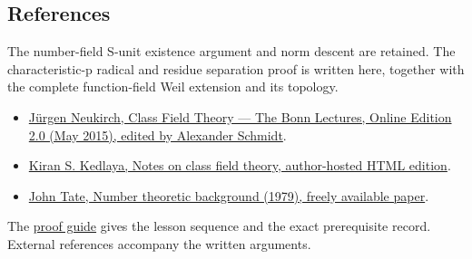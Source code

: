 \documentclass[11pt,a4paper]{article}
\newcommand{\tightlist}{\setlength{\itemsep}{0pt}\setlength{\parskip}{0pt}}
\begin{document}
\subsection{References}\label{references}

The number-field S-unit existence argument and norm descent are
retained. The characteristic-p radical and residue separation proof is
written here, together with the complete function-field Weil extension
and its topology.

\begin{itemize}
\tightlist
\item
  \href{https://www.mathi.uni-heidelberg.de/~schmidt/Neukirch-en/Neukirch_cft_02_may15.pdf}{Jürgen
  Neukirch, Class Field Theory --- The Bonn Lectures, Online Edition 2.0
  (May 2015), edited by Alexander Schmidt}.
\item
  \href{https://kskedlaya.org/cft/sec_abstractcft1.html}{Kiran S.
  Kedlaya, Notes on class field theory, author-hosted HTML edition}.
\item
  \href{https://ncatlab.org/nlab/files/TateNumberTheory.pdf}{John Tate,
  Number theoretic background (1979), freely available paper}.
\end{itemize}

The \href{../free-proofs.html}{proof guide} gives the lesson sequence
and the exact prerequisite record. External references accompany the
written arguments.
\end{document}
